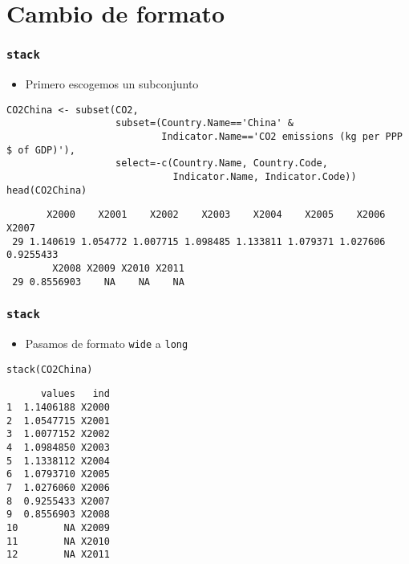 \documentclass[xcolor={usenames,svgnames,dvipsnames}]{beamer}
\begin{document}
\section{Cambio de formato}
\label{sec-4}
\begin{frame}[fragile]
\frametitle{\texttt{stack}}
\label{sec-4-1}

\begin{itemize}
\item Primero escogemos un subconjunto
\end{itemize}

\lstset{language=R}
\begin{lstlisting}
CO2China <- subset(CO2,
                   subset=(Country.Name=='China' &
                           Indicator.Name=='CO2 emissions (kg per PPP $ of GDP)'),
                   select=-c(Country.Name, Country.Code,
                             Indicator.Name, Indicator.Code))
head(CO2China)
\end{lstlisting}

\begin{verbatim}
       X2000    X2001    X2002    X2003    X2004    X2005    X2006     X2007
 29 1.140619 1.054772 1.007715 1.098485 1.133811 1.079371 1.027606 0.9255433
        X2008 X2009 X2010 X2011
 29 0.8556903    NA    NA    NA
\end{verbatim}
\end{frame}
\begin{frame}[fragile]
\frametitle{\texttt{stack}}
\label{sec-4-2}

\begin{itemize}
\item Pasamos de formato \texttt{wide} a \texttt{long}
\end{itemize}

\lstset{language=R}
\begin{lstlisting}
stack(CO2China)
\end{lstlisting}


\begin{verbatim}
      values   ind
1  1.1406188 X2000
2  1.0547715 X2001
3  1.0077152 X2002
4  1.0984850 X2003
5  1.1338112 X2004
6  1.0793710 X2005
7  1.0276060 X2006
8  0.9255433 X2007
9  0.8556903 X2008
10        NA X2009
11        NA X2010
12        NA X2011
\end{verbatim}
\end{frame}
\end{document}
